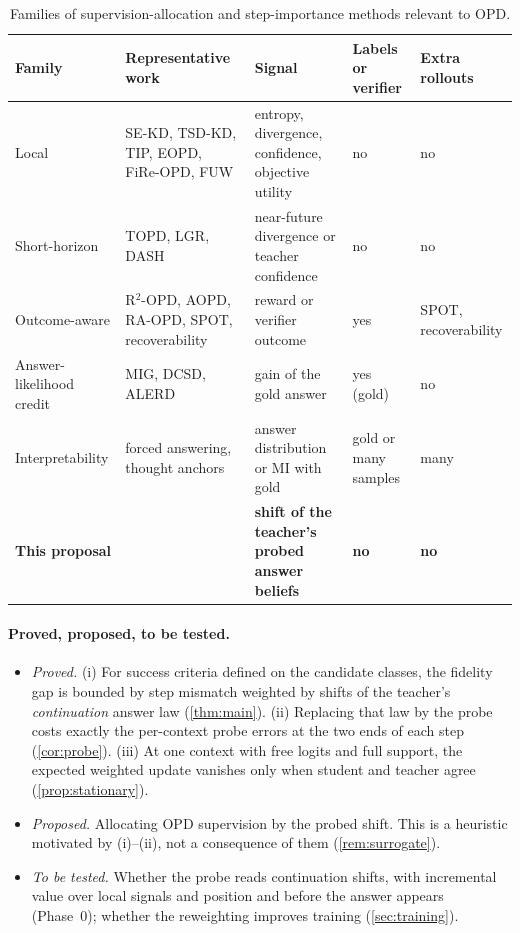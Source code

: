 \documentclass[11pt]{article}
\theoremstyle{definition}
\theoremstyle{remark}
\begin{document}
\begin{table}[h]
\centering
\small
\begin{tabular}{@{}>{\raggedright\arraybackslash}p{2.6cm}>{\raggedright\arraybackslash}p{4.0cm}>{\raggedright\arraybackslash}p{3.4cm}>{\raggedright\arraybackslash}p{1.6cm}>{\raggedright\arraybackslash}p{1.6cm}@{}}
\toprule
Family & Representative work & Signal & Labels or verifier & Extra rollouts \\
\midrule
Local & SE-KD, TSD-KD, TIP, EOPD, FiRe-OPD, FUW \citep{tavor2026rethinking,kim2026tsdkd,xu2026tip,jin2026eopd,li2026fire,fuw2026} & entropy, divergence, confidence, objective utility & no & no \\
Short-horizon & TOPD, LGR, DASH \citep{jiang2026topd,liu2026sfd,hou2026dash} & near-future divergence or teacher confidence & no & no \\
Outcome-aware & R$^2$-OPD, AOPD, RA-OPD, SPOT, recoverability \citep{r2opd2026,aopd2026,raopd2026,qu2026spot,jiang2026recoverability} & reward or verifier outcome & yes & SPOT, recoverability \\
Answer-likelihood credit & MIG, DCSD, ALERD \citep{wang2026stepwise,li2026decoupled,alerd2026} & gain of the gold answer & yes (gold) & no \\
Interpretability & forced answering, thought anchors \citep{lanham2023measuring,bogdan2025thought,qian2025mipeaks} & answer distribution or MI with gold & gold or many samples & many \\
\midrule
\textbf{This proposal} & & \textbf{shift of the teacher's probed answer beliefs} & \textbf{no} & \textbf{no} \\
\bottomrule
\end{tabular}
\caption{Families of supervision-allocation and step-importance methods relevant to OPD.}
\label{tab:positioning}
\end{table}

\paragraph{Proved, proposed, to be tested.}
\begin{itemize}[itemsep=2pt]
\item \emph{Proved.} (i) For success criteria defined on the candidate classes, the fidelity gap is bounded by step mismatch weighted by shifts of the teacher's \emph{continuation} answer law (\cref{thm:main}). (ii) Replacing that law by the probe costs exactly the per-context probe errors at the two ends of each step (\cref{cor:probe}). (iii) At one context with free logits and full support, the expected weighted update vanishes only when student and teacher agree (\cref{prop:stationary}).
\item \emph{Proposed.} Allocating OPD supervision by the probed shift. This is a heuristic motivated by (i)--(ii), not a consequence of them (\cref{rem:surrogate}).
\item \emph{To be tested.} Whether the probe reads continuation shifts, with incremental value over local signals and position and before the answer appears (Phase~0); whether the reweighting improves training (\cref{sec:training}).
\end{itemize}
\end{document}
